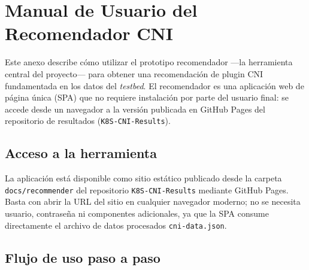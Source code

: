 \chapter{Manual de Usuario del Recomendador CNI} \label{anexo:manual_usuario}

Este anexo describe cómo utilizar el prototipo recomendador ---la herramienta central del proyecto--- para obtener una recomendación de plugin CNI fundamentada en los datos del \emph{testbed}. El recomendador es una aplicación web de página única (SPA) que no requiere instalación por parte del usuario final: se accede desde un navegador a la versión publicada en GitHub Pages del repositorio de resultados (\texttt{K8S-CNI-Results}).

\section{Acceso a la herramienta}

La aplicación está disponible como sitio estático publicado desde la carpeta \texttt{docs/recommender} del repositorio \texttt{K8S-CNI-Results} mediante GitHub Pages. Basta con abrir la URL del sitio en cualquier navegador moderno; no se necesita usuario, contraseña ni componentes adicionales, ya que la SPA consume directamente el archivo de datos procesados \texttt{cni-data.json}.

\section{Flujo de uso paso a paso}

